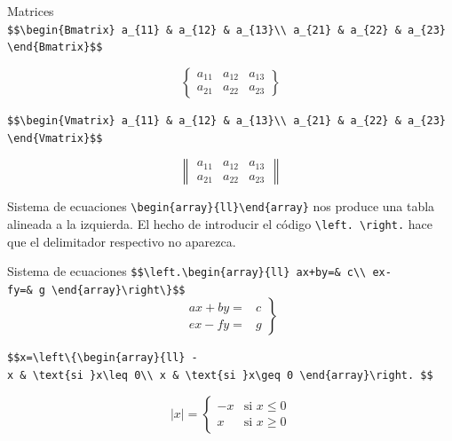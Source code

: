\documentclass[
  ignorenonframetext,
  aspectratio=169]{beamer}
\begin{document}
\begin{frame}[fragile]{Matrices}
\label{matrices-2}
\texttt{\$\$\textbackslash{}begin\{Bmatrix\}\ a\_\{11\}\ \&\ a\_\{12\}\ \&\ a\_\{13\}\textbackslash{}\textbackslash{}\ a\_\{21\}\ \&\ a\_\{22\}\ \&\ a\_\{23\}\ \textbackslash{}end\{Bmatrix\}\$\$}

\[\begin{Bmatrix}
a_{11} & a_{12} & a_{13}\\
a_{21} & a_{22} & a_{23}
\end{Bmatrix}\]

\texttt{\$\$\textbackslash{}begin\{Vmatrix\}\ a\_\{11\}\ \&\ a\_\{12\}\ \&\ a\_\{13\}\textbackslash{}\textbackslash{}\ a\_\{21\}\ \&\ a\_\{22\}\ \&\ a\_\{23\}\ \textbackslash{}end\{Vmatrix\}\$\$}

\[\begin{Vmatrix}
a_{11} & a_{12} & a_{13}\\
a_{21} & a_{22} & a_{23}
\end{Vmatrix}\]
\end{frame}

\begin{frame}[fragile]{Sistema de ecuaciones}
\label{sistema-de-ecuaciones}
\texttt{\textbackslash{}begin\{array\}\{ll\}\textbackslash{}end\{array\}}
nos produce una tabla alineada a la izquierda. El hecho de introducir el
código \texttt{\textbackslash{}left.\ \textbackslash{}right.} hace que
el delimitador respectivo no aparezca.
\end{frame}

\begin{frame}[fragile]{Sistema de ecuaciones}
\label{sistema-de-ecuaciones-1}
\texttt{\$\$\textbackslash{}left.\textbackslash{}begin\{array\}\{ll\}\ ax+by=\&\ c\textbackslash{}\textbackslash{}\ ex-fy=\&\ g\ \textbackslash{}end\{array\}\textbackslash{}right\textbackslash{}\}\$\$}
\[\left.\begin{array}{ll}
ax+by=& c\\
ex-fy=& g
\end{array}\right\}\]

\texttt{\$\$\textbar{}x\textbar{}=\textbackslash{}left\textbackslash{}\{\textbackslash{}begin\{array\}\{ll\}\ -x\ \&\ \textbackslash{}text\{si\ \}x\textbackslash{}leq\ 0\textbackslash{}\textbackslash{}\ x\ \&\ \textbackslash{}text\{si\ \}x\textbackslash{}geq\ 0\ \textbackslash{}end\{array\}\textbackslash{}right.\ \$\$}

\[|x|=\left\{\begin{array}{ll}
-x & \text{si }x\leq 0\\
x & \text{si }x\geq 0
\end{array}\right.\]
\end{frame}
\end{document}
